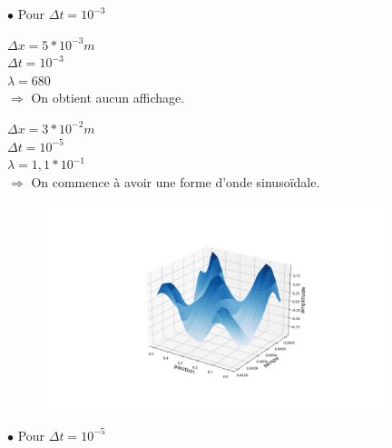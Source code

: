 \begin{enumerate}[label=\alph*)]

\hspace*{1cm}$\bullet$ Pour $\Delta t= {10}^{-3}$ \\
\newline

\begin{minipage}{.6\textwidth}%

\item $\Delta x=5*{10}^{-3}m$ \\
$\Delta t= {10}^{-3}$ \\
$\lambda= 680$\\


$\Longrightarrow$ On obtient aucun affichage.

\end{minipage}%

\begin{minipage}{.45\textwidth}%

\item $\Delta x=3*{10}^{-2}m$ \\
$\Delta t= {10}^{-5}$ \\
$\lambda= 1,1*{10}^{-1} $\\


$\Longrightarrow$ On commence à avoir une forme d'onde sinusoïdale. 

\end{minipage}%
\hfill
\begin{minipage}{.6\textwidth}%
\includegraphics[width=12cm,height=6cm]{dt=0.00001 avec dx=0.03.png}
\end{minipage}%


\hspace*{1cm}$\bullet$ Pour $\Delta t= {10}^{-5}$ \\


\end{enumerate}
